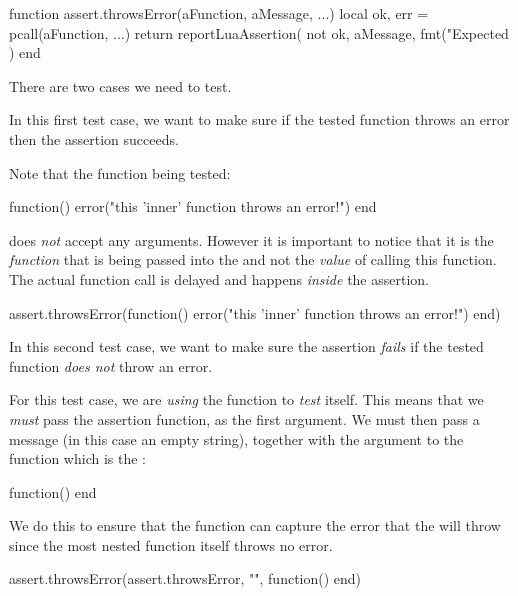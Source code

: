 \startLuaCode
function assert.throwsError(aFunction, aMessage, ...)
  local ok, err = pcall(aFunction, ...)
  return reportLuaAssertion(
    not ok,
    aMessage,
    fmt("Expected %
  )
end
\stopLuaCode

There are two cases we need to test.


In this first test case, we want to make sure if the tested function 
throws an error then the assertion succeeds.

Note that the function being tested: 

\starttyping[option=lua]
function()
  error("this 'inner' function throws an error!")
end
\stoptyping

\noindent does \emph{not} accept any arguments. However it is important to 
notice that it is the \emph{function} that is being passed into the 
 and not the \emph{value} of calling this 
function. The actual function call is delayed and happens \emph{inside} 
the assertion. 

\startLuaTest
  assert.throwsError(function()
    error("this 'inner' function throws an error!")
  end)
\stopLuaTest
\stopTestCase


In this second test case, we want to make sure the assertion \emph{fails} 
if the tested function \emph{does not} throw an error.

For this test case, we are \emph{using} the  
function to \emph{test} itself. This means that we \emph{must} pass the 
assertion function,  as the first argument. We 
must then pass a message (in this case an empty string), together with the 
argument to the   function which is 
the : 

\starttyping[option=lua]
function() end
\stoptyping

\noindent We do this to ensure that the  
 function can capture the error that the 
  will throw since the most 
 nested function itself throws no error. 

\startLuaTest
  assert.throwsError(assert.throwsError, "", function() end)
\stopLuaTest
\stopTestCase

\stopTestSuite


